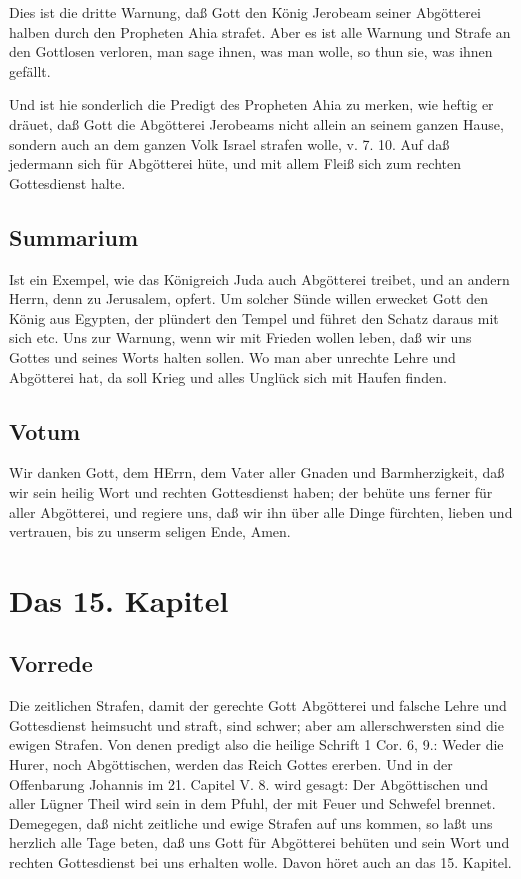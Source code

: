 Dies ist die dritte Warnung, daß Gott den König Jerobeam seiner Abgötterei halben durch den Propheten Ahia strafet. Aber es ist alle Warnung und Strafe an den Gottlosen verloren, man sage ihnen, was man wolle, so thun sie, was ihnen gefällt.

Und ist hie sonderlich die Predigt des Propheten Ahia zu merken, wie heftig er dräuet, daß Gott die Abgötterei Jerobeams nicht allein an seinem ganzen Hause, sondern auch an dem ganzen Volk Israel strafen wolle, v. 7. 10. Auf daß jedermann sich für Abgötterei hüte, und mit allem Fleiß sich zum rechten Gottesdienst halte.

\section{Summarium}

Ist ein Exempel, wie das Königreich Juda auch Abgötterei treibet, und an andern Herrn, denn zu Jerusalem, opfert. Um solcher Sünde willen erwecket Gott den König aus Egypten, der plündert den Tempel und führet den Schatz daraus mit sich etc. Uns zur Warnung, wenn wir mit Frieden wollen leben, daß wir uns Gottes und seines Worts halten sollen. Wo man aber unrechte Lehre und Abgötterei hat, da soll Krieg und alles Unglück sich mit Haufen finden.

\section{Votum}

Wir danken Gott, dem HErrn, dem Vater aller Gnaden und Barmherzigkeit, daß wir sein heilig Wort und rechten Gottesdienst haben; der behüte uns ferner für aller Abgötterei, und regiere uns, daß wir ihn über alle Dinge fürchten, lieben und vertrauen, bis zu unserm seligen Ende, Amen.

\chapter{Das 15. Kapitel}

\section{Vorrede}

Die zeitlichen Strafen, damit der gerechte Gott Abgötterei und falsche Lehre und Gottesdienst heimsucht und straft, sind schwer; aber am allerschwersten sind die ewigen Strafen. Von denen predigt also die heilige Schrift 1 Cor. 6, 9.: Weder die Hurer, noch Abgöttischen, werden das Reich Gottes ererben. Und in der Offenbarung Johannis im 21. Capitel V. 8. wird gesagt: Der Abgöttischen und aller Lügner Theil wird sein in dem Pfuhl, der mit Feuer und Schwefel brennet. Demegegen, daß nicht zeitliche und ewige Strafen auf uns kommen, so laßt uns herzlich alle Tage beten, daß uns Gott für Abgötterei behüten und sein Wort und rechten Gottesdienst bei uns erhalten wolle. Davon höret auch an das 15. Kapitel.

